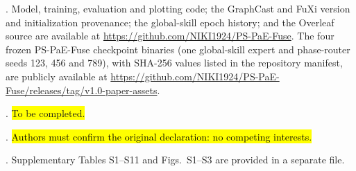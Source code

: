 \documentclass[12pt]{article}
\newcommand{\todo}[1]{\hl{#1}}
\begin{document}
\vspace*{3mm}
. Model, training, evaluation and plotting code; the GraphCast and FuXi version and initialization provenance; the global-skill epoch history; and the Overleaf source are available at \url{https://github.com/NIKI1924/PS-PaE-Fuse}. The four frozen PS-PaE-Fuse checkpoint binaries (one global-skill expert and phase-router seeds 123, 456 and 789), with SHA-256 values listed in the repository manifest, are publicly available at \url{https://github.com/NIKI1924/PS-PaE-Fuse/releases/tag/v1.0-paper-assets}.

\vspace*{3mm}
. \colorbox{yellow}{To be completed.}

\vspace*{3mm}
. \todo{Authors must confirm the original declaration: no competing interests.}

\vspace*{3mm}
. Supplementary Tables S1--S11 and Figs.~S1--S3 are provided in a separate file.
\end{document}
